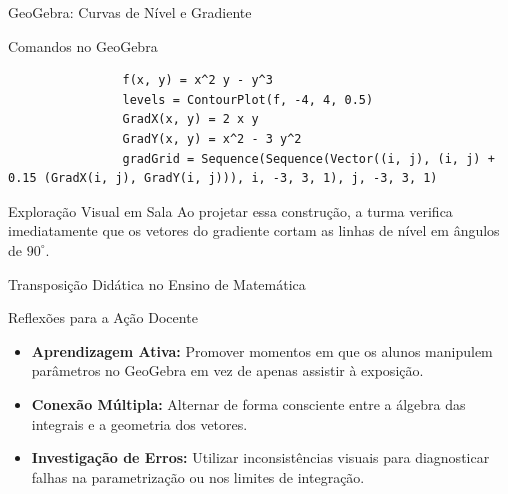 \documentclass[aspectratio=169, 13pt]{beamer}
\begin{document}
	\begin{frame}[fragile]{GeoGebra: Curvas de Nível e Gradiente}
		\begin{block}{Comandos no GeoGebra}
			\begin{lstlisting}
				f(x, y) = x^2 y - y^3
				levels = ContourPlot(f, -4, 4, 0.5)
				GradX(x, y) = 2 x y
				GradY(x, y) = x^2 - 3 y^2
				gradGrid = Sequence(Sequence(Vector((i, j), (i, j) + 0.15 (GradX(i, j), GradY(i, j))), i, -3, 3, 1), j, -3, 3, 1)
			\end{lstlisting}
		\end{block}
		
		\begin{exampleblock}{Exploração Visual em Sala}
			Ao projetar essa construção, a turma verifica imediatamente que os vetores do gradiente cortam as linhas de nível em ângulos de $90^\circ$.
		\end{exampleblock}
	\end{frame}
	
	\begin{frame}{Transposição Didática no Ensino de Matemática}
		\begin{block}{Reflexões para a Ação Docente}
			\begin{itemize}
				\item \textbf{Aprendizagem Ativa:} Promover momentos em que os alunos manipulem parâmetros no GeoGebra em vez de apenas assistir à exposição.
				\item \textbf{Conexão Múltipla:} Alternar de forma consciente entre a álgebra das integrais e a geometria dos vetores.
				\item \textbf{Investigação de Erros:} Utilizar inconsistências visuais para diagnosticar falhas na parametrização ou nos limites de integração.
			\end{itemize}
		\end{block}
	\end{frame}
	
\end{document}
